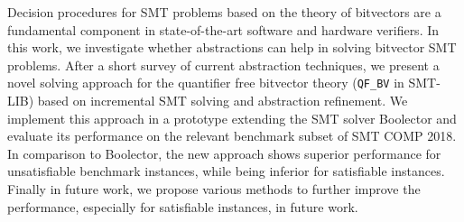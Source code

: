 
\Abstract
Decision procedures for SMT problems based on the theory of bitvectors are a fundamental component in state-of-the-art software and hardware verifiers.
In this work, we investigate whether abstractions can help in solving bitvector SMT problems.
After a short survey of current abstraction techniques, we present a novel solving approach for the quantifier free bitvector theory (\texttt{QF\_BV} in SMT-LIB) based on incremental SMT solving and abstraction refinement.
We implement this approach in a prototype extending the SMT solver Boolector and evaluate its performance on the relevant benchmark subset of SMT COMP 2018.
In comparison to Boolector, the new approach shows superior performance for unsatisfiable benchmark instances, while being inferior for satisfiable instances.
Finally in future work, we propose various methods to further improve the performance, especially for satisfiable instances, in future work.